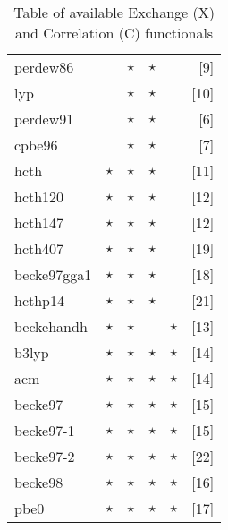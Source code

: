 \begin{table}[htp]
\begin{tabular}{|l|cccc|r|}
\hline                                                  
perdew86   &          &   $\star$     &  $\star$  &        &[9]\\
lyp        &          &   $\star$     &  $\star$  &        &[10]\\
perdew91   &          &   $\star$     &  $\star$  &        &[6]\\
cpbe96     &          &   $\star$     &  $\star$  &        &[7]\\
\hline                                                  
hcth       & $\star$    &   $\star$     &  $\star$  &        &[11]\\
hcth120    & $\star$    &   $\star$     &  $\star$  &        &[12]\\
hcth147    & $\star$    &   $\star$     &  $\star$  &        &[12]\\
hcth407    & $\star$    &   $\star$     &  $\star$  &        &[19]\\
becke97gga1  & $\star$    &   $\star$     &  $\star$  &        &[18]\\
hcthp14    & $\star$    &   $\star$     &  $\star$  &        &[21]\\
\hline                                                  
beckehandh & $\star$    &   $\star$     &           & $\star$  &[13]\\
b3lyp      & $\star$    &   $\star$     &  $\star$  & $\star$  &[14]\\
acm        & $\star$    &   $\star$     &  $\star$  & $\star$  &[14]\\
becke97    & $\star$    &   $\star$     &  $\star$  & $\star$  &[15]\\
becke97-1  & $\star$    &   $\star$     &  $\star$  & $\star$  &[15]\\
becke97-2  & $\star$    &   $\star$     &  $\star$  & $\star$  &[22]\\
becke98    & $\star$    &   $\star$     &  $\star$  & $\star$  &[16]\\
pbe0       & $\star$    &   $\star$     &  $\star$  & $\star$  &[17]\\
\hline
\end{tabular}
\caption{Table of available Exchange (X) and Correlation (C) functionals}
\label{tablexc}
\end{table}
